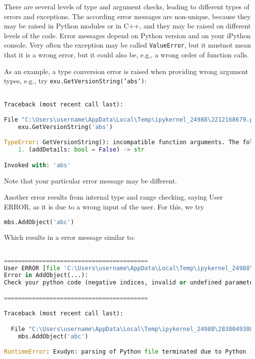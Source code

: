 \label{sec:cinterface:exceptions}
There are several levels of type and argument checks, leading to different types of errors and exceptions. The according error messages are non-unique, because they may be raised in Python modules or in C++, and they may be raised on different levels of the code. Error messages depend on Python version and on your iPython console. Very often the exception may be called \texttt{ValueError}, but it mustnot mean that it is a wrong error, but it could also be, e.g., a wrong order of function calls.

As an example, a type conversion error is raised when providing wrong argument types, e.g., try \texttt{exu.GetVersionString('abs')}:
\pythonstyle
\begin{lstlisting}[language=Python, firstnumber=1]

Traceback (most recent call last):

File "C:\Users\username\AppData\Local\Temp\ipykernel_24988\2212168679.py", line 1, in <module>
    exu.GetVersionString('abs')

TypeError: GetVersionString(): incompatible function arguments. The following argument types are supported:
    1. (addDetails: bool = False) -> str

Invoked with: 'abs'
\end{lstlisting}


Note that your particular error message may be different.

Another error results from internal type and range checking, saying User ERROR, as it is due to a wrong input of the user. For this, we try
\pythonstyle
\begin{lstlisting}[language=Python, firstnumber=1]
mbs.AddObject('abc')
\end{lstlisting}


Which results in a error message similar to:
\pythonstyle
\begin{lstlisting}[language=Python, firstnumber=1]

=========================================
User ERROR [file 'C:\Users\username\AppData\Local\Temp\ipykernel_24988\2838049308.py', line 1]: 
Error in AddObject(...):
Check your python code (negative indices, invalid or undefined parameters, ...)

=========================================

Traceback (most recent call last):

  File "C:\Users\username\AppData\Local\Temp\ipykernel_24988\2838049308.py", line 1, in <module>
    mbs.AddObject('abc')

RuntimeError: Exudyn: parsing of Python file terminated due to Python (user) error
\end{lstlisting}


